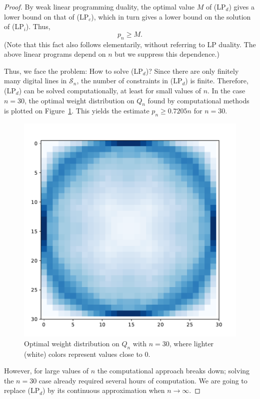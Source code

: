 \documentclass[11pt,a4paper]{amsart}
\newcommand{\Sc}{\mathcal{S}}
\begin{document}
\begin{proof}
\noindent
By weak linear programming duality, the optimal value $M$ of (LP$_d$) gives a lower bound on that of (LP$_c$), which in turn gives a lower bound on the solution of (LP$_i$). Thus,
\begin{equation}\label{pnM}
p_n \geq M.
\end{equation}
(Note that this fact also follows elementarily, without referring to LP duality. The above linear programs depend on $n$ but we suppress this dependence.)

Thus, we face the problem: How to solve (LP$_d$)? Since there are only finitely many  digital lines in $\Sc_n$,  the number of constraints in (LP$_d$) is finite. Therefore, (LP$_d$) can be solved computationally, at least for small values of $n$. In the case $n=30$, the optimal weight distribution on $Q_n$ found by computational methods is plotted on Figure~\ref{fig2}. This yields the estimate $p_n \geq 0.7205n$ for $n=30$.

\begin{figure}[h]
  \centering
  \includegraphics[width = 0.45 \textwidth]{Figures/weight_30_A.pdf}
  \caption{Optimal weight distribution on $Q_{n}$ with $n = 30$, where lighter (white) colors represent values close to 0. }
  \label{fig2}
\end{figure}

However, for large values of $n$ the computational approach breaks down; solving the $n=30$ case already required several hours of computation.
We are going to replace (LP$_d$) by its continuous approximation when $n \rightarrow \infty$.


\end{proof}
\end{document}
